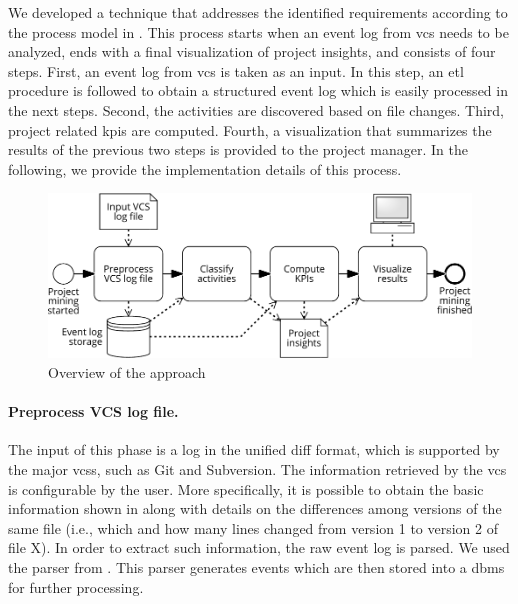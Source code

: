 

We developed a technique that addresses the identified requirements according to the process model in . 
This process starts when an event log from \gls{vcs} needs to be analyzed, ends with a final visualization of project insights, and consists of four steps.
First, an event log from \gls{vcs} is taken as an input. In this step, an \gls{etl} procedure is followed to obtain a structured event log which is easily processed in the next steps. Second, the activities are discovered based on file changes. Third, project related \glspl{kpi} are computed. Fourth, a visualization that summarizes the results of the previous two steps is provided to the project manager. In the following, we provide the implementation details of this process.

\begin{figure}[]
    \centering
    \includegraphics[width=.7\textwidth]{figures/overview}
    \caption{Overview of the approach}
    \label{fig:approach-overview}
\end{figure}




\paragraph{Preprocess VCS log file.}

The input of this phase is a log in the unified diff format, which is supported
by the major \glspl{vcs}, such as Git and Subversion. The information retrieved by the \gls{vcs} is configurable by the user. More specifically, it is possible to obtain the basic information shown in  along with details on the differences among versions of the same file (i.e., which and how many lines changed from version 1 to version 2 of file X). In order to extract such information, the raw event log is parsed. We used the parser from \cite{DBLP:conf/bpm/BalaRGBMS17}. This parser generates events which are then stored into a \gls{dbms} for further processing. 

